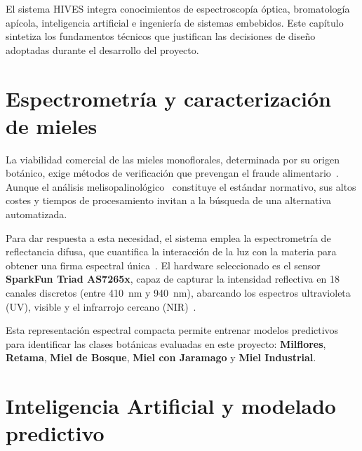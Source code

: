 
El sistema HIVES integra conocimientos de espectroscopía óptica, bromatología apícola, inteligencia artificial e ingeniería de sistemas embebidos. Este capítulo sintetiza los fundamentos técnicos que justifican las decisiones de diseño adoptadas durante el desarrollo del proyecto.

\section{Espectrometría y caracterización de mieles}

La viabilidad comercial de las mieles monoflorales, determinada por su origen botánico, exige métodos de verificación que prevengan el fraude alimentario~\cite{eu2001honey}. Aunque el análisis melisopalinológico~\cite{louveaux1978methods} constituye el estándar normativo, sus altos costes y tiempos de procesamiento invitan a  la búsqueda de una alternativa automatizada.

Para dar respuesta a esta necesidad, el sistema emplea la espectrometría de reflectancia difusa, que cuantifica la interacción de la luz con la materia para obtener una firma espectral única~\cite{skoog2018principios}. El hardware seleccionado es el sensor \textbf{SparkFun Triad AS7265x}, capaz de capturar la intensidad reflectiva en 18 canales discretos (entre 410~nm y 940~nm), abarcando los espectros ultravioleta (UV), visible y el infrarrojo cercano (NIR)~\cite{ams2018as7265x}.


Esta representación espectral compacta permite entrenar modelos predictivos para identificar las clases botánicas evaluadas en este proyecto: \textbf{Milflores}, \textbf{Retama}, \textbf{Miel de Bosque}, \textbf{Miel con Jaramago} y \textbf{Miel Industrial}.


\section{Inteligencia Artificial y modelado predictivo}

